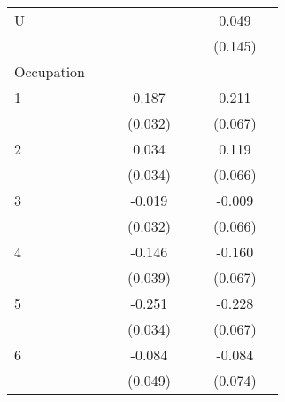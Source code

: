 {\begin{longtable}{l*{3}{c}|l*{3}{c}}
				U                   &                     &                     &                     &                     &                     &       0.049         \\
		&                     &                     &                     &                     &                     &     (0.145)         \\
		Occupation &&&&&\\
		1                   &                     &                     &       0.187\sym{***}&                     &                     &       0.211\sym{**} \\
		&                     &                     &     (0.032)         &                     &                     &     (0.067)         \\
		2                   &                     &                     &       0.034         &                     &                     &       0.119         \\
		&                     &                     &     (0.034)         &                     &                     &     (0.066)         \\
		3                   &                     &                     &      -0.019         &                     &                     &      -0.009         \\
		&                     &                     &     (0.032)         &                     &                     &     (0.066)         \\
		4                   &                     &                     &      -0.146\sym{***}&                     &                     &      -0.160\sym{*}  \\
		&                     &                     &     (0.039)         &                     &                     &     (0.067)         \\
		5                   &                     &                     &      -0.251\sym{***}&                     &                     &      -0.228\sym{***}\\
		&                     &                     &     (0.034)         &                     &                     &     (0.067)         \\
		6                   &                     &                     &      -0.084         &                     &                     &      -0.084         \\
		&                     &                     &     (0.049)         &                     &                     &     (0.074)         \\

\end{longtable}}
